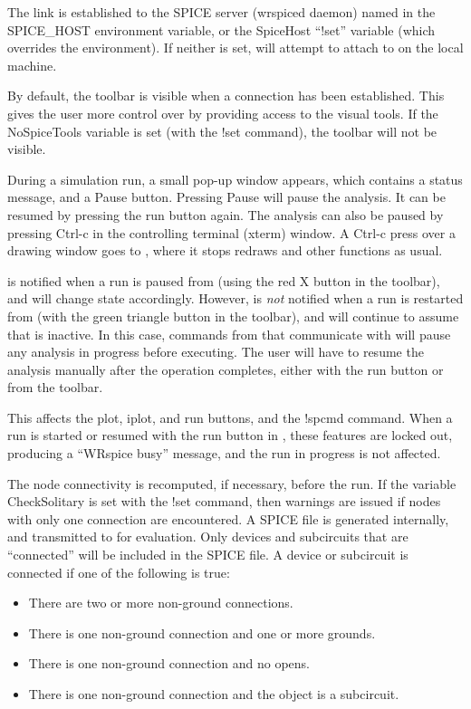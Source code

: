 The link is established to the SPICE server ({\vt wrspiced} daemon)
named in the {\et SPICE\_HOST} environment variable, or the {\et
SpiceHost} ``!set'' variable (which overrides the environment).  If
neither is set, {\Xic} will attempt to attach to {\WRspice} on the
local machine.

By default, the {\WRspice} toolbar is visible when a connection has
been established.  This gives the user more control over {\WRspice} by
providing access to the visual tools.  If the {\et NoSpiceTools}
variable is set (with the {\cb !set} command), the toolbar will not be
visible.

During a simulation run, a small pop-up window appears, which contains
a status message, and a {\cb Pause} button.  Pressing {\cb Pause} will
pause the analysis.  It can be resumed by pressing the {\cb run}
button again.  The analysis can also be paused by pressing {\kb
Ctrl-c} in the controlling terminal (xterm) window.  A {\kb Ctrl-c}
press over a drawing window goes to {\Xic}, where it stops redraws and
other functions as usual.

{\Xic} is notified when a run is paused from {\WRspice} (using the red
X button in the toolbar), and will change state accordingly.  However,
{\Xic} is {\it not} notified when a run is restarted from {\WRspice}
(with the green triangle button in the toolbar), and will continue to
assume that {\WRspice} is inactive.  In this case, commands from
{\Xic} that communicate with {\WRspice} will pause any analysis in
progress before executing.  The user will have to resume the analysis
manually after the operation completes, either with the {\cb run}
button or from the {\WRspice} toolbar.
 
This affects the {\cb plot}, {\cb iplot}, and {\cb run} buttons, and
the {\cb !spcmd} command.  When a run is started or resumed with the
{\cb run} button in {\Xic}, these features are locked out, producing a
``WRspice busy'' message, and the run in progress is not affected.

The node connectivity is recomputed, if necessary, before the run.  If
the variable {\et CheckSolitary} is set with the {\cb !set} command,
then warnings are issued if nodes with only one connection are
encountered.  A SPICE file is generated internally, and transmitted to
{\WRspice} for evaluation.  Only devices and subcircuits that are
``connected'' will be included in the SPICE file.  A device or
subcircuit is connected if one of the following is true:
\begin{itemize}
\item{There are two or more non-ground connections.}
\item{There is one non-ground connection and one or more grounds.}
\item{There is one non-ground connection and no opens.}
\item{There is one non-ground connection and the object is a subcircuit.}
\end{itemize}

